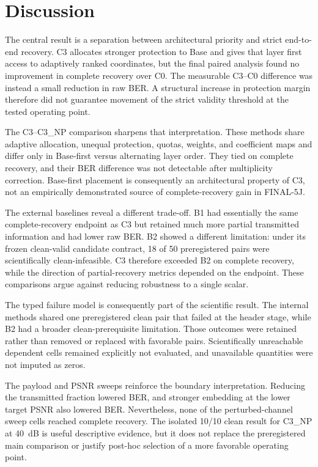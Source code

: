\section{Discussion}

The central result is a separation between architectural priority and strict end-to-end recovery. C3 allocates stronger protection to Base and gives that layer first access to adaptively ranked coordinates, but the final paired analysis found no improvement in complete recovery over C0. The measurable C3--C0 difference was instead a small reduction in raw BER. A structural increase in protection margin therefore did not guarantee movement of the strict validity threshold at the tested operating point.

The C3--C3\_NP comparison sharpens that interpretation. These methods share adaptive allocation, unequal protection, quotas, weights, and coefficient maps and differ only in Base-first versus alternating layer order. They tied on complete recovery, and their BER difference was not detectable after multiplicity correction. Base-first placement is consequently an architectural property of C3, not an empirically demonstrated source of complete-recovery gain in FINAL-5J.

The external baselines reveal a different trade-off. B1 had essentially the same complete-recovery endpoint as C3 but retained much more partial transmitted information and had lower raw BER. B2 showed a different limitation: under its frozen clean-valid candidate contract, 18 of 50 preregistered pairs were scientifically clean-infeasible. C3 therefore exceeded B2 on complete recovery, while the direction of partial-recovery metrics depended on the endpoint. These comparisons argue against reducing robustness to a single scalar.

The typed failure model is consequently part of the scientific result. The internal methods shared one preregistered clean pair that failed at the header stage, while B2 had a broader clean-prerequisite limitation. Those outcomes were retained rather than removed or replaced with favorable pairs. Scientifically unreachable dependent cells remained explicitly not evaluated, and unavailable quantities were not imputed as zeros.

The payload and PSNR sweeps reinforce the boundary interpretation. Reducing the transmitted fraction lowered BER, and stronger embedding at the lower target PSNR also lowered BER. Nevertheless, none of the perturbed-channel sweep cells reached complete recovery. The isolated 10/10 clean result for C3\_NP at 40~dB is useful descriptive evidence, but it does not replace the preregistered main comparison or justify post-hoc selection of a more favorable operating point.

